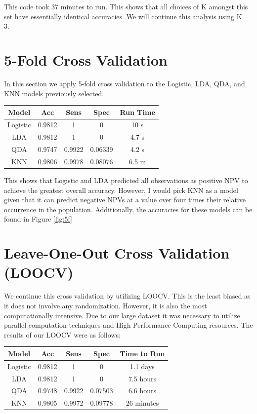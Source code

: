 \documentclass[10pt,twocolumn,letterpaper]{article}
\begin{document}
This code took 37 minutes to run. This shows that all choices of K amongst this set have essentially identical accuracies. We will continue this analysis using K = 3.

\section{5-Fold Cross Validation}

In this section we apply 5-fold cross validation to the Logistic, LDA, QDA, and KNN models previously selected.

\begin{center}
	\begin{tabular}{ |c|c|c|c|c| } 
		\hline
		Model & Acc & Sens & Spec & Run Time\\ 
		\hline
		Logistic & 0.9812 & 1 & 0 & 10 s \\
		\hline
		LDA & 0.9812 & 1 & 0 & 4.7 s\\ 
		\hline
		QDA & 0.9747 & 0.9922 & 0.06339 & 4.2 s\\ 
		\hline
		KNN & 0.9806 & 0.9978 & 0.08076 & 6.5 m\\ 
		\hline
		
	\end{tabular}
\end{center}

This shows that Logistic and LDA predicted all observations as positive NPV to achieve the greatest overall accuracy. However, I would pick KNN as a model given that it can predict negative NPVs at a value over four times their relative occurrence in the population. Additionally, the accuracies for these models can be found in Figure \ref{fig:5f}



\section{Leave-One-Out Cross Validation (LOOCV)}

We continue this cross validation by utilizing LOOCV. This is the least biased as it does not involve any randomization. However, it is also the most computationally intensive. Due to our large dataset it was necessary to utilize parallel computation techniques and High Performance Computing resources. The results of our LOOCV were as follows:

\begin{center}
	\begin{tabular}{ |c|c|c|c|c| } 
		\hline
		Model & Acc & Sens & Spec & Time to Run  \\ 
		\hline
		Logistic & 0.9812 & 1 & 0 & 1.1 days \\
		\hline
		LDA & 0.9812 & 1 & 0 & 7.5 hours\\ 
		\hline
		QDA & 0.9748 & 0.9922 & 0.07503 & 6.6 hours\\ 
		\hline
		KNN & 0.9805 & 0.9972 & 0.09778 & 26 minutes\\ 
		\hline
		
	\end{tabular}
\end{center}
\end{document}

